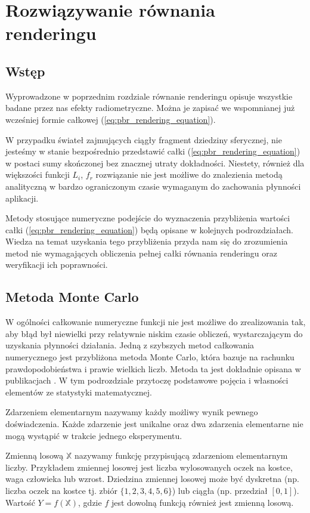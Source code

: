 \documentclass[../main.tex]{subfiles}
\begin{document}
\chapter{Rozwiązywanie równania renderingu}

\section{Wstęp}

Wyprowadzone w poprzednim rozdziale równanie renderingu opisuje wszystkie badane przez nas efekty radiometryczne. Można je zapisać we wspomnianej już wcześniej formie całkowej (\ref{eq:pbr_rendering_equation}).

W przypadku świateł zajmujących ciągły fragment dziedziny sferycznej, nie jesteśmy w stanie bezpośrednio przedstawić całki (\ref{eq:pbr_rendering_equation}) w postaci sumy skończonej bez znacznej utraty dokładności. Niestety, również dla większości funkcji $L_i$, $f_r$ rozwiązanie nie jest możliwe do znalezienia metodą analityczną w bardzo ograniczonym czasie wymaganym do zachowania płynności aplikacji.

Metody stosujące numeryczne podejście do wyznaczenia przybliżenia wartości całki (\ref{eq:pbr_rendering_equation}) będą opisane w kolejnych podrozdziałach. Wiedza na temat uzyskania tego przybliżenia przyda nam się do zrozumienia metod nie wymagających obliczenia pełnej całki równania renderingu oraz weryfikacji ich poprawności.

\section{Metoda Monte Carlo}

W ogólności całkowanie numeryczne funkcji nie jest możliwe do zrealizowania tak, aby błąd był niewielki przy relatywnie niskim czasie obliczeń, wystarczającym do uzyskania płynności działania. Jedną z szybszych metod całkowania numerycznego jest przybliżona metoda Monte Carlo, która bazuje na rachunku prawdopodobieństwa i prawie wielkich liczb. Metoda ta jest dokładnie opisana w publikacjach \cite{Sierocinski,MonteCarloAnderson,Veach}. W tym podrozdziale przytoczę podstawowe pojęcia i własności elementów ze statystyki matematycznej.

Zdarzeniem elementarnym nazywamy każdy możliwy wynik pewnego doświadczenia. Każde zdarzenie jest unikalne oraz dwa zdarzenia elementarne nie mogą wystąpić w trakcie jednego eksperymentu.

Zmienną losową $\mathbb{X}$ nazywamy funkcję przypisującą zdarzeniom elementarnym liczby. Przykładem zmiennej losowej jest liczba wylosowanych oczek na kostce, waga człowieka lub wzrost. Dziedzina zmiennej losowej może być dyskretna (np. liczba oczek na kostce tj. zbiór $\{1,2,3,4,5,6\}$) lub ciągła (np. przedział $[0,1]$). Wartość $Y = f(\mathbb{X})$, gdzie $f$ jest dowolną funkcją również jest zmienną losową. 
\end{document}

